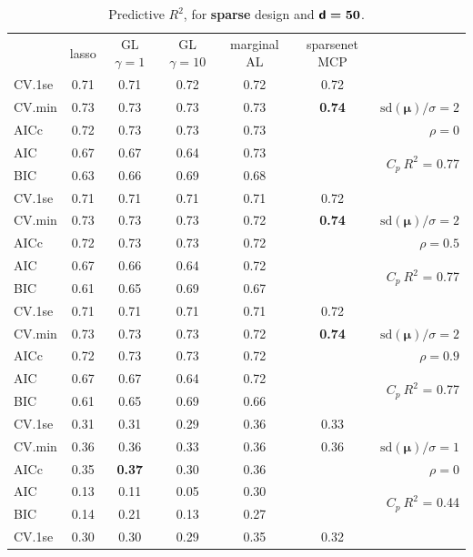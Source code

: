 \documentclass[12pt]{article}
\newcommand{\mr}[1]{\mathrm{#1}}
\newcommand{\bm}[1]{\mathbf{#1}}
\begin{document}
\begin{table}[p]\vspace{-.5cm}
\caption[l]{ Predictive $R^2$, for {\bf sparse} design and  $\boldsymbol{{\sf d}=50}$.}
\vspace{-.5cm}
\small{}
\begin{center}
\begin{tabular}{l*{5}{c}|r}
 & lasso & GL $\gamma=1$ & GL $\gamma=10$ & marginal AL & sparsenet MCP  &  \\
\cline{1-7}
CV.1se & 0.71 & 0.71 & 0.72 & 0.72 & 0.72 &\\
CV.min & 0.73 & 0.73 & 0.73 & 0.73 & {\bf 0.74} &  $\mr{sd}(\bm{\mu})/\sigma=2$ \\
AICc & 0.72 & 0.73 & 0.73 & 0.73 & & $\rho=0$ \\
AIC & 0.67 & 0.67 & 0.64 & 0.73 & & \multirow{2}{*}{$C_p ~ R^2$ = 0.77} \\
BIC & 0.63 & 0.66 & 0.69 & 0.68 & & \\
 \hline 
CV.1se & 0.71 & 0.71 & 0.71 & 0.71 & 0.72 &\\
CV.min & 0.73 & 0.73 & 0.73 & 0.72 & {\bf 0.74} &  $\mr{sd}(\bm{\mu})/\sigma=2$ \\
AICc & 0.72 & 0.73 & 0.73 & 0.72 & & $\rho=0.5$ \\
AIC & 0.67 & 0.66 & 0.64 & 0.72 & & \multirow{2}{*}{$C_p ~ R^2$ = 0.77} \\
BIC & 0.61 & 0.65 & 0.69 & 0.67 & & \\
 \hline 
CV.1se & 0.71 & 0.71 & 0.71 & 0.71 & 0.72 &\\
CV.min & 0.73 & 0.73 & 0.73 & 0.72 & {\bf 0.74} &  $\mr{sd}(\bm{\mu})/\sigma=2$ \\
AICc & 0.72 & 0.73 & 0.73 & 0.72 & & $\rho=0.9$ \\
AIC & 0.67 & 0.67 & 0.64 & 0.72 & & \multirow{2}{*}{$C_p ~ R^2$ = 0.77} \\
BIC & 0.61 & 0.65 & 0.69 & 0.66 & & \\
 \hline 
CV.1se & 0.31 & 0.31 & 0.29 & 0.36 & 0.33 &\\
CV.min & 0.36 & 0.36 & 0.33 & 0.36 & 0.36 &  $\mr{sd}(\bm{\mu})/\sigma=1$ \\
AICc & 0.35 & {\bf 0.37} & 0.30 & 0.36 & & $\rho=0$ \\
AIC & 0.13 & 0.11 & 0.05 & 0.30 & & \multirow{2}{*}{$C_p ~ R^2$ = 0.44} \\
BIC & 0.14 & 0.21 & 0.13 & 0.27 & & \\
 \hline 
CV.1se & 0.30 & 0.30 & 0.29 & 0.35 & 0.32 &\\

\end{tabular}
\end{center}
\end{table}
\end{document}
